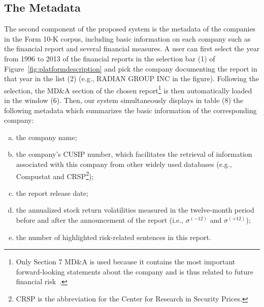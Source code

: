 \documentclass[10pt,conference,letterpaper]{IEEEtran}
\begin{document}
\subsection{The Metadata}
    The second component of the proposed system is the metadata of the companies in the Form 10-K corpus, including basic information on each company such as the financial report and several financial measures. A user can first select the year from 1996 to 2013 of the financial reports in the selection bar (1) of Figure~\ref{fig:platformdescription} and pick the company documenting the report in that year in the list (2) (e.g., RADIAN GROUP INC in the figure). Following the selection, the MD\&A section of the chosen report\footnote{Only Section 7 MD\&A is used because it contains the most important forward-looking statements about the company and is thus related to future financial risk~\cite{kogan2009predicting,loughran2011liability}.} is then automatically loaded in the window (6). Then, our system simultaneously displays in table (8) the following metadata which summarizes the basic information of the corresponding company:

\begin{enumerate}[(a)]
  \item the company name;
  \item the company's CUSIP number, which facilitates the retrieval of information associated with this company from other widely used databases (e.g., Compustat and CRSP\footnote{CRSP is the abbreviation for the Center for Research in Security Prices.});
  \item the report release date;
  \item the annualized stock return volatilities measured in the twelve-month period before and after the announcement of the report (i.e., $\sigma^{(-12)}$ and $\sigma^{(+12)}$);
  \item the number of highlighted risk-related sentences in this report.
\end{enumerate}
\end{document}
